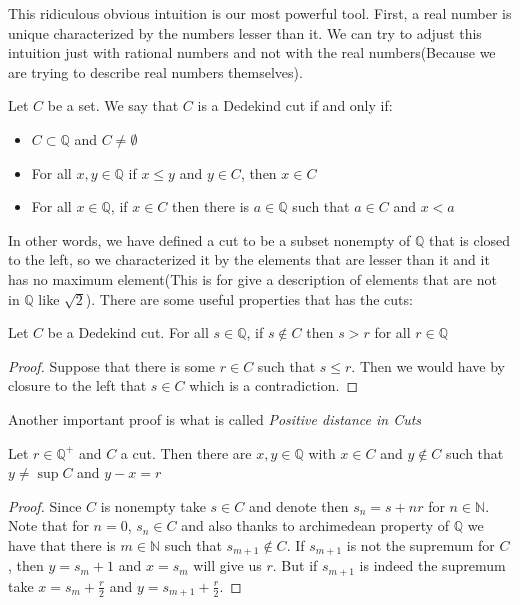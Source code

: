 \documentclass{tufte-handout}
\begin{document}
This ridiculous obvious intuition is our most powerful tool. First, a real number is unique characterized by the numbers lesser than it. We can try to adjust this intuition just with rational numbers and not with the real numbers(Because we are trying to describe real numbers themselves). 

\begin{definition}
	Let $C$ be a set. We say that $C$ is a Dedekind cut if and only if:
	\begin{itemize}
		\item $C \subset \mathbb{Q}$ and $C \neq \emptyset$
		\item For all $x, y \in \mathbb{Q}$ if $x \le y$ and $y \in C$, then $x \in C$
		\item For all $x \in \mathbb{Q}$, if $x \in C$ then there is $a \in \mathbb{Q}$ such that $a \in C$ and $x < a$
	\end{itemize}
\end{definition}

In other words, we have defined a cut to be a subset nonempty of $\mathbb{Q}$ that is closed to the left, so we characterized it by the elements that are lesser than it and it has no maximum element(This is for give a description of elements that are not in $\mathbb{Q}$ like $\sqrt{2}$). There are some useful properties that has the cuts:
\begin{theorem}
	Let $C$ be a Dedekind cut. For all $s \in \mathbb{Q}$, if $s \not \in C$ then $s > r$ for all $r \in \mathbb{Q}$
\end{theorem}
\begin{proof}
	Suppose that there is some $r \in C$ such that $s \le r$. Then we would have by closure to the left that $s \in C$ which is a contradiction.
\end{proof}

Another important proof is what is called \textit{Positive distance in Cuts}
\begin{theorem}
	Let $r \in \mathbb{Q}^+$ and $C$ a cut. Then there are $x, y \in \mathbb{Q}$ with $x \in C$ and $y \not \in C$ such that $y \neq \sup C$ and $y - x = r$
\end{theorem}
\begin{proof}
	Since $C$ is nonempty take $s \in C$ and denote then $s_n = s+nr$ for $n \in \mathbb{N}$. Note that for $n = 0$, $s_n \in C$ and also thanks to archimedean property of $\mathbb{Q}$ we have that there is $m \in \mathbb{N}$ such that $s_{m + 1} \not \in C$. If $s_{m + 1}$ is not the supremum for $C$, then $y = {s_m + 1}$ and $x = s_m$ will give us $r$. But if $s_{m+1}$ is indeed the supremum take $x = s_m + \frac{r}{2}$ and $y = s_{m + 1} + \frac{r}{2}$.
\end{proof}
\end{document}
